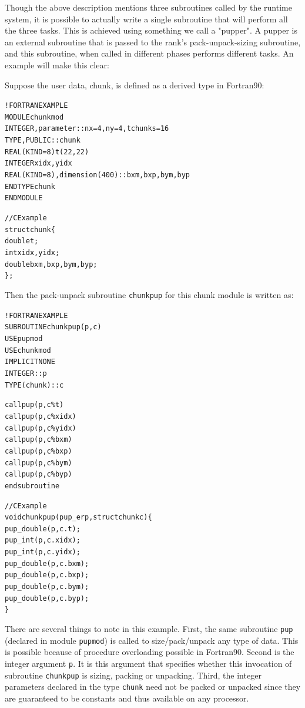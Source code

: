 \documentclass[10pt]{article}
\begin{document}
Though the above description mentions three subroutines called by the \ampi{}
runtime system, it is possible to actually write a single subroutine that will
perform all the three tasks. This is achieved using something we call a
"pupper". A pupper is an external subroutine that is passed to the rank's
pack-unpack-sizing subroutine, and this subroutine, when called in different
phases performs different tasks. An example will make this clear:

Suppose the user data, chunk, is defined as a derived type in Fortran90:

\begin{alltt}
!FORTRAN EXAMPLE
MODULE chunkmod
  INTEGER, parameter :: nx=4, ny=4, tchunks=16
  TYPE, PUBLIC :: chunk
      REAL(KIND=8) t(22,22)
      INTEGER xidx, yidx
      REAL(KIND=8), dimension(400):: bxm, bxp, bym, byp
  END TYPE chunk
END MODULE

//C Example
struct chunk\{
  double t;
  int xidx, yidx;
  double bxm,bxp,bym,byp;
\};
\end{alltt}

Then the pack-unpack subroutine \texttt{chunkpup} for this chunk module is
written as:

\begin{alltt}
!FORTRAN EXAMPLE
SUBROUTINE chunkpup(p, c)
  USE pupmod
  USE chunkmod
  IMPLICIT NONE
  INTEGER :: p
  TYPE(chunk) :: c

  call pup(p, c\%t)
  call pup(p, c\%xidx)
  call pup(p, c\%yidx)
  call pup(p, c\%bxm)
  call pup(p, c\%bxp)
  call pup(p, c\%bym)
  call pup(p, c\%byp)
end subroutine

//C Example
void chunkpup(pup_er p, struct chunk c)\{
  pup_double(p,c.t);
  pup_int(p,c.xidx);
  pup_int(p,c.yidx);
  pup_double(p,c.bxm);
  pup_double(p,c.bxp);
  pup_double(p,c.bym);
  pup_double(p,c.byp);
\}
\end{alltt}

There are several things to note in this example. First, the same subroutine
\texttt{pup} (declared in module \texttt{pupmod}) is called to size/pack/unpack
any type of data. This is possible because of procedure overloading possible in
Fortran90. Second is the integer argument \texttt{p}. It is this argument that
specifies whether this invocation of subroutine \texttt{chunkpup} is sizing,
packing or unpacking. Third, the integer parameters declared in the type
\texttt{chunk} need not be packed or unpacked since they are guaranteed to be
constants and thus available on any processor.
\end{document}
